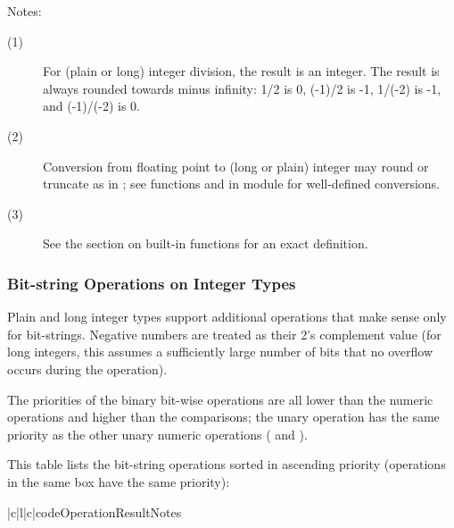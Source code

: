 \noindent
Notes:
\begin{description}

\item[(1)]
For (plain or long) integer division, the result is an integer.
The result is always rounded towards minus infinity: 1/2 is 0, 
(-1)/2 is -1, 1/(-2) is -1, and (-1)/(-2) is 0.

\item[(2)]
Conversion from floating point to (long or plain) integer may round or
truncate as in \C{}; see functions  and  in
module  for well-defined conversions.

\item[(3)]
See the section on built-in functions for an exact definition.

\end{description}

\subsubsection{Bit-string Operations on Integer Types}

Plain and long integer types support additional operations that make
sense only for bit-strings.  Negative numbers are treated as their 2's
complement value (for long integers, this assumes a sufficiently large
number of bits that no overflow occurs during the operation).

The priorities of the binary bit-wise operations are all lower than
the numeric operations and higher than the comparisons; the unary
operation \samp{\~} has the same priority as the other unary numeric
operations (\samp{+} and \samp{-}).

This table lists the bit-string operations sorted in ascending
priority (operations in the same box have the same priority):

\begin{tableiii}{|c|l|c|}{code}{Operation}{Result}{Notes}
  \hline
  \hline
  \hline
  \hline
  \hline
\end{tableiii}


